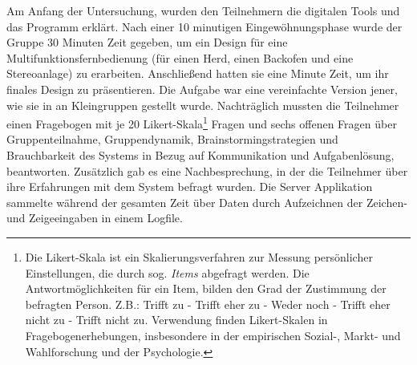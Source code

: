 \medskip Am Anfang der Untersuchung, wurden den Teilnehmern die digitalen Tools und das Programm erklärt. Nach einer 10 minutigen Eingewöhnungsphase wurde der Gruppe 30 Minuten Zeit gegeben, um ein Design für eine Multifunktionsfernbedienung (für einen Herd, einen Backofen und eine Stereoanlage) zu erarbeiten. Anschließend hatten sie eine Minute Zeit, um ihr finales Design zu präsentieren. Die Aufgabe war eine vereinfachte Version jener, wie sie in \citep{Tang1991143} an Kleingruppen gestellt wurde. Nachträglich mussten die Teilnehmer einen Fragebogen mit je 20 Likert-Skala\footnote{Die Likert-Skala ist ein Skalierungsverfahren zur Messung persönlicher Einstellungen, die durch sog. \emph{Items} abgefragt werden. Die Antwortmöglichkeiten für ein Item, bilden den Grad der Zustimmung der befragten Person. Z.B.: Trifft zu - Trifft eher zu - Weder noch - Trifft eher nicht zu - Trifft nicht zu. Verwendung finden Likert-Skalen in Fragebogenerhebungen, insbesondere in der empirischen Sozial-, Markt- und Wahlforschung und der Psychologie.} Fragen und sechs offenen Fragen über Gruppenteilnahme, Gruppendynamik, Brainstormingstrategien und Brauchbarkeit des Systems in Bezug auf Kommunikation und Aufgabenlösung, beantworten. Zusätzlich gab es eine Nachbesprechung, in der die Teilnehmer über ihre Erfahrungen mit dem System befragt wurden. Die Server Applikation sammelte während der gesamten Zeit über Daten durch Aufzeichnen der Zeichen- und Zeigeeingaben in einem Logfile.

